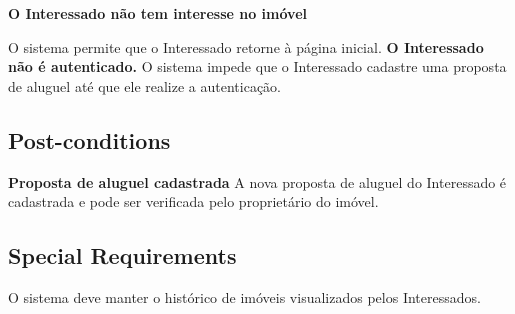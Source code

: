 \textbf{O Interessado não tem interesse no imóvel}

O sistema permite que o Interessado retorne à página inicial.
\textbf{O Interessado não é autenticado.}
O sistema impede que o Interessado cadastre uma proposta de aluguel até que ele realize a
autenticação.

\subsection*{Post-conditions}

\textbf{Proposta de aluguel cadastrada}
A nova proposta de aluguel do Interessado é cadastrada e pode ser verificada pelo proprietário do
imóvel.


\subsection*{Special Requirements} 
O sistema deve manter o histórico de imóveis visualizados pelos Interessados.